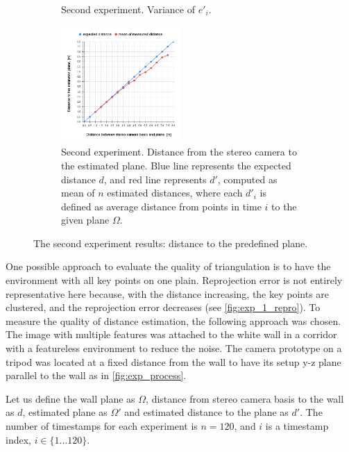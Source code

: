\begin{figure}[ht]
\begin{subfigure}[ht]{0.49\textwidth}
    \caption{Second experiment. Variance of $e'_i$.}
    \label{fig:exp_2_var}
  \end{subfigure}
  \begin{subfigure}[b]{\textwidth}
      \centering
      \includegraphics[width=0.5\textwidth]{graphics/experiment_2_chart_planesist.png}
      \caption{Second experiment. Distance from the stereo camera to the estimated plane.
      Blue line represents the expected distance $d$, and red line represents $d'$, computed as mean of $n$ estimated distances, where each $d'_{i}$ is defined as average distance from points in time $i$ to the given plane $\Omega$.}
      \label{fig:exp_2_res}
  \end{subfigure}
  \caption{The second experiment results: distance to the predefined plane.}
  \label{fig:exp_2_}
\end{figure}

One possible approach to evaluate the quality of triangulation is to have the environment with all key points on one plain.
Reprojection error is not entirely representative here because, with the distance increasing, the key points are clustered, and the reprojection error decreases (see \autoref{fig:exp_1_repro}).
To measure the quality of distance estimation, the following approach was chosen.
The image with multiple features was attached to the white wall in a corridor with a featureless environment to reduce the noise.
The camera prototype on a tripod was located at a fixed distance from the wall to have its setup y-z plane parallel to the wall as in \autoref{fig:exp_process}.

Let us define the wall plane as $\Omega$, distance from stereo camera basis to the wall as $d$, estimated plane as $\Omega'$ and estimated distance to the plane as $d'$.
The number of timestamps for each experiment is $n=120$, and $i$ is a timestamp index, $i \in \{1 \dots 120\}$.

